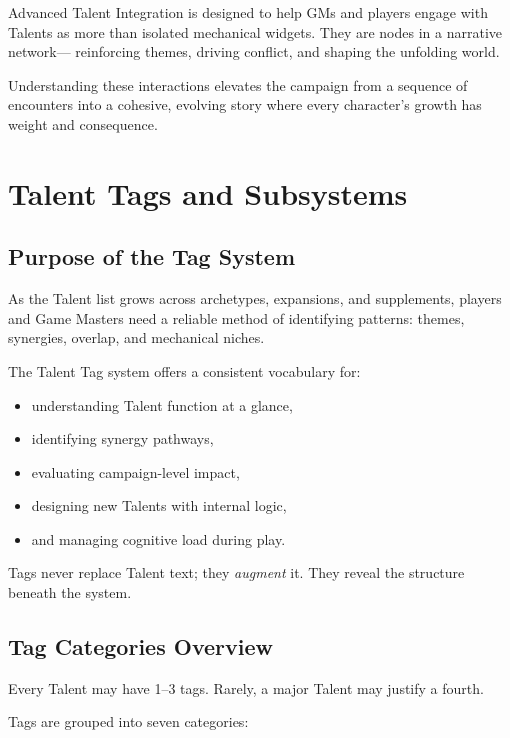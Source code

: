 \documentclass[11pt]{book}
\begin{document}
Advanced Talent Integration is designed to help GMs and players engage with Talents
as more than isolated mechanical widgets.
They are nodes in a narrative network---
reinforcing themes, driving conflict, and shaping the unfolding world.

Understanding these interactions elevates the campaign
from a sequence of encounters into a cohesive, evolving story
where every character's growth has weight and consequence.


\chapter{Talent Tags and Subsystems}

\section{Purpose of the Tag System}

As the Talent list grows across archetypes, expansions, and supplements,
players and Game Masters need a reliable method of identifying patterns:
themes, synergies, overlap, and mechanical niches.

The Talent Tag system offers a consistent vocabulary for:
\begin{itemize}
    \item understanding Talent function at a glance,
    \item identifying synergy pathways,
    \item evaluating campaign-level impact,
    \item designing new Talents with internal logic,
    \item and managing cognitive load during play.
\end{itemize}

Tags never replace Talent text; they \emph{augment} it.
They reveal the structure beneath the system.

\section{Tag Categories Overview}

Every Talent may have 1--3 tags.  
Rarely, a major Talent may justify a fourth.

Tags are grouped into seven categories:
\end{document}
